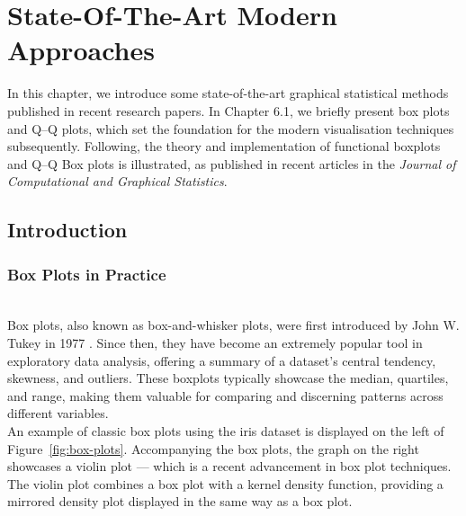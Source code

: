 \documentclass{article}\usepackage[]{graphicx}\usepackage[]{xcolor}
\numberwithin{equation}{section}
\begin{document}
\newpage 

\section{State-Of-The-Art Modern Approaches}

In this chapter, we introduce some state-of-the-art graphical statistical methods published in recent research papers. In Chapter 6.1, we briefly present box plots and Q–Q plots, which set the foundation for the modern visualisation techniques subsequently. Following, the theory and implementation of functional boxplots and Q–Q Box plots is illustrated, as published in recent articles in the \textit{Journal of Computational and Graphical Statistics}. 

\subsection{Introduction}

\subsubsection{Box Plots in Practice}\\

\noindent 
Box plots, also known as box-and-whisker plots, were first introduced by John W. Tukey in 1977 \cite{tukey1977exploratory}. Since then, they have become an extremely popular tool in exploratory data analysis, offering a summary of a dataset's central tendency, skewness, and outliers. These boxplots typically showcase the median, quartiles, and range, making them valuable for comparing and discerning patterns across different variables.\\

\noindent
An example of classic box plots using the iris dataset is displayed on the left of Figure~\ref{fig:box-plots}. Accompanying the box plots, the graph on the right showcases a violin plot — which is a recent advancement in box plot techniques. The violin plot combines a box plot with a kernel density function, providing a mirrored density plot displayed in the same way as a box plot.\\
\end{document}
